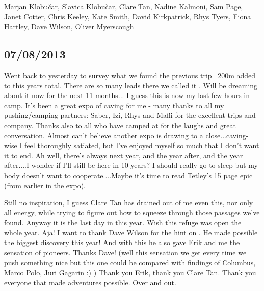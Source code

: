 \begin{pagefigure}
      \checkoddpage \ifoddpage \forcerectofloat \else \forceversofloat \fi
      \centering
       \label{end expo}
  \caption{Marjan Klobu\v{c}ar, Slavica Klobu\v{c}ar, Clare Tan, Nadine Kalmoni, Sam Page, Janet Cotter, Chris Keeley, Kate Smith, David Kirkpatrick, Rhys Tyers, Fiona Hartley, Dave Wilson, Oliver Myerscough }
\end{pagefigure}


\subsection{07/08/2013}
Went back to  yesterday to survey what we found the previous trip ~200m added to this years total. There are so many leads there we called it . Will be dreaming about it now for the next 11 months...
I guess this is now my last few hours in camp. It's been a great expo of caving for me - many thanks to all my pushing/camping partners: Saber, Izi, Rhys and Maffi for the excellent trips and company. Thanks also to all who have camped at  for the laughs and great conversation.
Almost can't believe another expo is drawing to a close...caving-wise I feel thoroughly satiated, but I've enjoyed myself so much that I don't want it to end. Ah well, there's always next year, and the year after, and the year after....I wonder if I'll still be here in 10 years?
I should really go to sleep but my body doesn't want to cooperate....Maybe it's time to read Tetley's 15 page epic (from earlier in the expo). 

\vspace{2.5ex}
Still no inspiration, I guess Clare Tan has drained out of me even this, nor only all energy, while trying to figure out how to squeeze through those passages we've found. Anyway it is the last day in  this year. Wish this refuge was open the whole year. Aja! I want to thank Dave Wilson for the hint on . He made possible the biggest discovery this year! And with this he also gave Erik and me the sensation of pioneers. Thanks Dave! (well this sensation we get every time we push something nice but this one could be compared with findings of Columbus, Marco Polo, Juri Gagarin :) ) Thank you Erik, thank you Clare Tan. Thank you everyone that made  adventures possible. Over and out.





